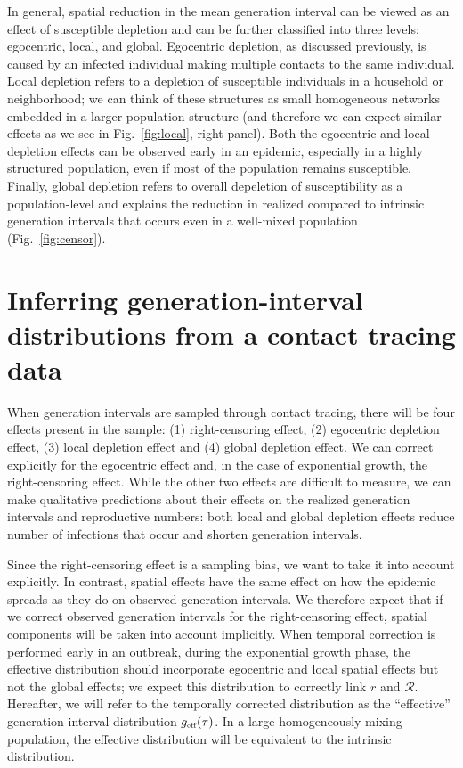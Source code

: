 \documentclass[12pt]{article}
\newcommand{\fref}[1]{Fig.~\ref{fig:#1}}
\newcommand{\RR}{\ensuremath{{\mathcal R}}}
\newcommand{\tsub}[2]{#1_{{\textrm{\tiny #2}}}}
\begin{document}
In general, spatial reduction in the mean generation interval can be viewed as an effect of susceptible depletion and can be further classified into three levels: egocentric, local, and global.
Egocentric depletion, as discussed previously, is caused by an infected individual making multiple contacts to the same individual.
Local depletion refers to a depletion of susceptible individuals in a household or neighborhood;
we can think of these structures as small homogeneous networks embedded in a larger population structure (and therefore we can expect similar effects as we see in \fref{local}, right panel).
Both the egocentric and local depletion effects can be observed early in an epidemic, especially in a highly structured population, even if most of the population remains susceptible.
Finally, global depletion refers to overall depeletion of susceptibility as a population-level and explains the reduction in realized compared to intrinsic generation intervals that occurs even in a well-mixed population (\fref{censor}). 

\section{Inferring generation-interval distributions from a contact tracing data}

When generation intervals are sampled through contact tracing, there will be four effects present in the sample: (1) right-censoring effect, (2) egocentric depletion effect, (3) local depletion effect and (4) global depletion effect.
We can correct explicitly for the egocentric effect and, in the case of exponential growth, the right-censoring effect.
While the other two effects are difficult to measure, we can make qualitative predictions about their effects on the realized generation intervals and reproductive numbers: 
both local and global depletion effects reduce number of infections that occur and shorten generation intervals.

Since the right-censoring effect is a sampling bias, we want to take it into account explicitly.
In contrast, spatial effects have the same effect on how the epidemic spreads as they do on observed generation intervals. 
We therefore expect that if we correct observed generation intervals for the right-censoring effect, spatial components will be taken into account implicitly. 
When temporal correction is performed early in an outbreak, during the exponential growth phase, the effective distribution should incorporate egocentric and local spatial effects but not the global effects; we expect this distribution to correctly link $r$ and $\RR$.
Hereafter, we will refer to the temporally corrected distribution as the ``effective'' generation-interval distribution $\tsub{g}{eff}(\tau)$.
In a large homogeneously mixing population, the effective distribution will be equivalent to the intrinsic distribution.
\end{document}
